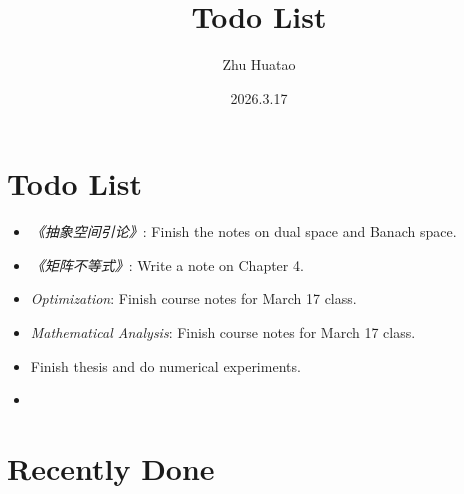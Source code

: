 \documentclass[UTF8]{ctexart}
\title{Todo List}
\author{Zhu Huatao}
\date{2026.3.17}
\begin{document}
\maketitle

\section*{Todo List}

\begin{itemize}
    \item \textit{《抽象空间引论》}: Finish the notes on dual space and Banach space.
    \item \textit{《矩阵不等式》}: Write a note on Chapter 4.
    \item \textit{Optimization}: Finish course notes for March 17 class.
    \item \textit{Mathematical Analysis}: Finish course notes for March 17 class.
    \item Finish thesis and do numerical experiments.
\end{itemize}

%   

\begin{itemize}
    \item
\end{itemize}

\newpage

\section*{Recently Done}
\end{document}
